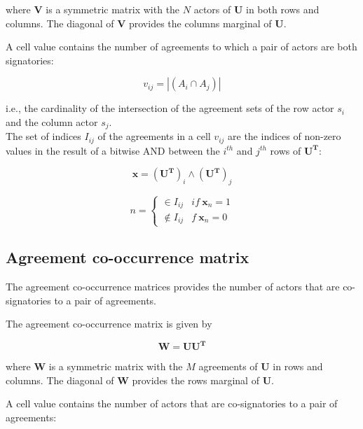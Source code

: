 \documentclass{article}
\begin{document}
where $\bm{V}$ is a symmetric matrix with the $N$ actors of $\bm{U}$ in both rows and columns. The diagonal of $\bm{V}$ provides the columns marginal of $\bm{U}$.\newline

A cell value contains the number of agreements to which a pair of actors are both signatories:

\begin{equation}
v_{ij} =  |(A_{i} \cap A_{j}) | 
\end{equation}

i.e., the cardinality of the intersection of the agreement sets of the row actor $s_i$ and the column actor $s_j$. \\

The set of indices $I_{ij}$ of the agreements in a cell $v_{ij}$ are the indices of non-zero values in the result of a bitwise AND between the $i^{th}$ and $j^{th}$ rows of $\bm{U^T}$:

\begin{equation}
\bm{x} = \bm{(U^T)}_i \land \bm{(U^T)} _j
\end{equation}

\begin{equation}
n =
\begin{cases}
\in I_{ij} & if \  \bm{x}_n = 1\\
\notin I_{ij} & f \  \bm{x}_n = 0
\end{cases}
\end{equation}

\subsection{Agreement co-occurrence matrix}

The agreement co-occurrence matrices provides the number of actors that are co-signatories to a pair of agreements.\newline

The agreement co-occurrence matrix is given by

\begin{equation}
\bm{W= UU^T}
\end{equation}

where $\bm{W}$ is a symmetric matrix with the $M$ agreements of $\bm{U}$ in rows and columns. The diagonal of $\bm{W}$ provides the rows marginal of $\bm{U}$.\newline

A cell value contains the number of actors that are co-signatories to a pair of agreements:
\end{document}
